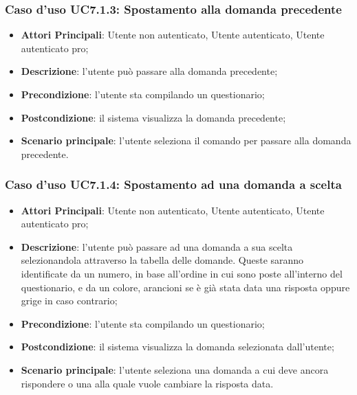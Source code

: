 \subsubsection{Caso d'uso UC7.1.3: Spostamento alla domanda precedente}
\label{UC7.1.3}
\begin{itemize}
\item\textbf{Attori Principali}: Utente non autenticato, Utente autenticato, Utente autenticato pro;
\item\textbf{Descrizione}: l'utente può passare alla domanda precedente;
\item\textbf{Precondizione}: l'utente sta compilando un questionario;
\item\textbf{Postcondizione}: il sistema visualizza la domanda precedente;
\item\textbf{Scenario principale}: l'utente seleziona il comando per passare alla domanda precedente.
\end{itemize}

\subsubsection{Caso d'uso UC7.1.4: Spostamento ad una domanda a scelta}
\label{UC7.1.4}
\begin{itemize}
\item\textbf{Attori Principali}: Utente non autenticato, Utente autenticato, Utente autenticato pro;
\item\textbf{Descrizione}: l'utente può passare ad una domanda a sua scelta selezionandola attraverso la tabella delle domande. Queste saranno identificate da un numero, in base all'ordine in cui sono poste all'interno del questionario, e da un colore, arancioni se è già stata data una risposta oppure grige in caso contrario;
\item\textbf{Precondizione}: l'utente sta compilando un questionario;
\item\textbf{Postcondizione}: il sistema visualizza la domanda selezionata dall'utente;
\item\textbf{Scenario principale}: l'utente seleziona una domanda a cui deve ancora rispondere o una alla quale vuole cambiare la risposta data.
\end{itemize}

